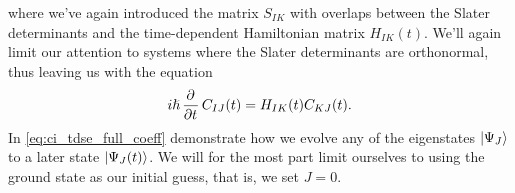        where we've again introduced the matrix $S_{IK}$ with overlaps between
        the Slater determinants and the time-dependent Hamiltonian matrix
        $H_{IK}(t)$.
        We'll again limit our attention to systems where the Slater
        determinants are orthonormal, thus leaving us with the equation
        \begin{align}
            i\hslash \dpd[]{}{t}C_{IJ}(t)
            = H_{IK}(t) C_{KJ}(t).
            \label{eq:ci_tdse_full_coeff}
        \end{align}
        In \autoref{eq:ci_tdse_full_coeff} demonstrate how we evolve any of the
        eigenstates $| \Psi_J \rangle$ to a later state $| \Psi_J(t) \rangle$.
        We will for the most part limit ourselves to using the ground state as
        our initial guess, that is, we set $J = 0$.
